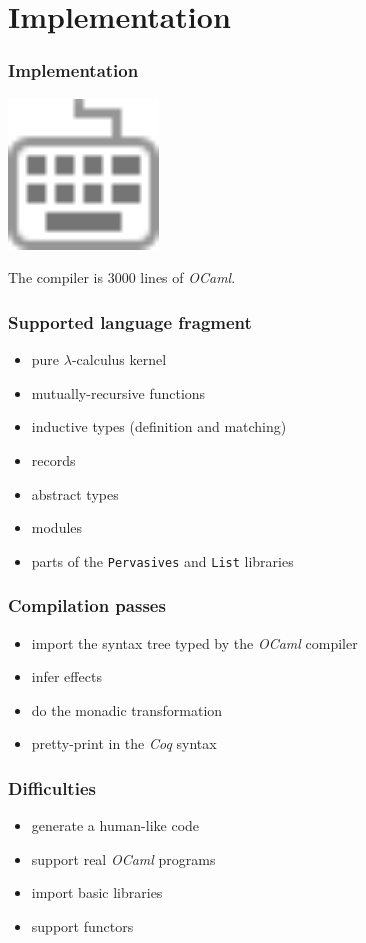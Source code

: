 \documentclass[hyperref={pdfpagelabels=false}]{beamer}
\begin{document}
  \section{Implementation}
  \begin{frame}
    \frametitle{Implementation}
    \begin{center}
      \includegraphics[width=4cm]{images/implementation}
    \end{center}
    \begin{center}
      The compiler is 3000 lines of \emph{OCaml}.
    \end{center}
  \end{frame}
  \begin{frame}
    \frametitle{Supported language fragment}
    \begin{itemize}
      \item pure $\lambda$-calculus kernel
      \item mutually-recursive functions
      \item inductive types (definition and matching)
      \item records
      \item abstract types
      \item modules
      \item parts of the \texttt{Pervasives} and \texttt{List} libraries
    \end{itemize}
  \end{frame}
  \begin{frame}
    \frametitle{Compilation passes}
    \begin{itemize}
      \item import the syntax tree typed by the \emph{OCaml} compiler
      \item infer effects
      \item do the monadic transformation
      \item pretty-print in the \emph{Coq} syntax
    \end{itemize}
  \end{frame}
  \begin{frame}
    \frametitle{Difficulties}
    \begin{itemize}
      \item generate a human-like code
      \item support real \emph{OCaml} programs
      \item import basic libraries
      \item support functors
    \end{itemize}
  \end{frame}
\end{document}
